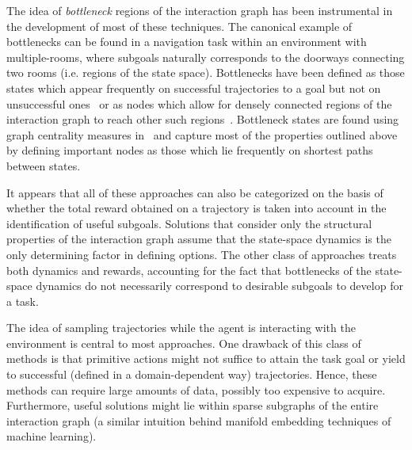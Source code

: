 \documentclass[12pt, oneside, extrafontsizes]{memoir}  %
\theoremstyle{plain}
\theoremstyle{definition}
\begin{document}
The idea of \textit{bottleneck}
regions of the interaction graph has been instrumental in the
development of most of these techniques.
The canonical example of bottlenecks can be found in a navigation
task within an environment with multiple-rooms, where subgoals naturally
corresponds to the doorways connecting two rooms (i.e. regions of the state
space). Bottlenecks have been defined as those states which
appear frequently on successful trajectories to a goal but not on
unsuccessful ones~\cite{Mcgovern2001, Stolle2002} or as nodes which
allow for densely connected regions of the interaction graph to
reach other such regions~\cite{Menache2002, Wolfe2005, Kazemitabar2009}.
Bottleneck states are found using graph centrality measures in~\cite{Barto2009, Rad2010} and capture most of the properties outlined
above by defining important nodes as those which lie frequently on
shortest paths between states.

It appears that all of these approaches can also be categorized on
the basis of whether the total reward obtained on a trajectory is
taken into account in the identification of useful subgoals. Solutions that consider only the structural
properties of the interaction graph assume that the state-space
dynamics is the only determining factor in defining options. The other class of approaches treats both dynamics and rewards, accounting for the fact that bottlenecks of
the state-space dynamics do not necessarily correspond to desirable
subgoals to develop for a task.

The idea of sampling trajectories while the agent is interacting
with the environment is central to most approaches. One drawback of this
class of methods is that primitive actions might not suffice to
attain the task goal or yield to successful (defined in a
domain-dependent way) trajectories. Hence, these methods can require large
amounts of data, possibly too expensive to acquire.
Furthermore, useful solutions might
 lie within sparse subgraphs of the entire interaction
graph (a similar intuition behind manifold embedding techniques of
machine learning).
\end{document}

